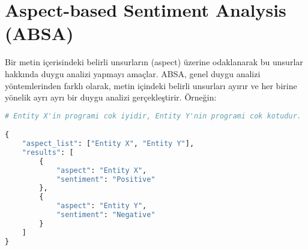 \section{Aspect-based Sentiment Analysis (ABSA)}

Bir metin içerisindeki belirli unsurların (aspect) üzerine odaklanarak bu unsurlar hakkında duygu analizi yapmayı amaçlar. ABSA, genel duygu analizi yöntemlerinden farklı olarak, metin içindeki belirli unsurları ayırır ve her birine yönelik ayrı ayrı bir duygu analizi gerçekleştirir.
Örneğin:

\begin{lstlisting}[language=Python]
# Entity X'in programi cok iyidir, Entity Y'nin programi cok kotudur.

{
    "aspect_list": ["Entity X", "Entity Y"],
    "results": [
        {
            "aspect": "Entity X",
            "sentiment": "Positive"
        },
        {
            "aspect": "Entity Y",
            "sentiment": "Negative"
        }
    ]
}
\end{lstlisting}

\newpage